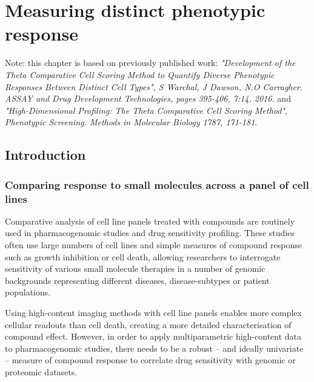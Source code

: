 \documentclass[a4paper,11pt,twoside,openright]{scrbook}
\begin{document}



\chapter{Measuring distinct phenotypic response} \label{chapter:tccs}

\scriptsize{Note: this chapter is based on previously published work: \textit{"Development of the Theta Comparative 
Cell Scoring Method to Quantify Diverse Phenotypic Responses Between Distinct Cell Types", S Warchal, J Dawson, N.O 
Carragher. ASSAY and Drug Development Technologies, pages 395-406, 7:14, 2016.} and \textit{"High-Dimensional 
Profiling: The Theta Comparative Cell Scoring Method", Phenotypic Screening. Methods in Molecular Biology 1787, 
171-181}.} 



\section{Introduction}
\normalsize
\subsection{Comparing response to small molecules across a panel of cell lines}

Comparative analysis of cell line panels treated with compounds are routinely used in pharmacogenomic studies and drug 
sensitivity profiling.
These studies often use large numbers of cell lines and simple measures of compound response such as growth inhibition 
or cell death, allowing researchers to interrogate sensitivity of various small molecule therapies in a number of 
genomic backgrounds representing different diseases, disease-subtypes or patient populations.

Using high-content imaging methods with cell line panels enables more complex cellular readouts than cell death, 
creating a more detailed characterisation of compound effect.
However, in order to apply multiparametric high-content data to pharmacogenomic studies, there needs to be a robust -- 
and ideally univariate -- measure of compound response to correlate drug sensitivity with genomic or proteomic datasets.
\end{document}
